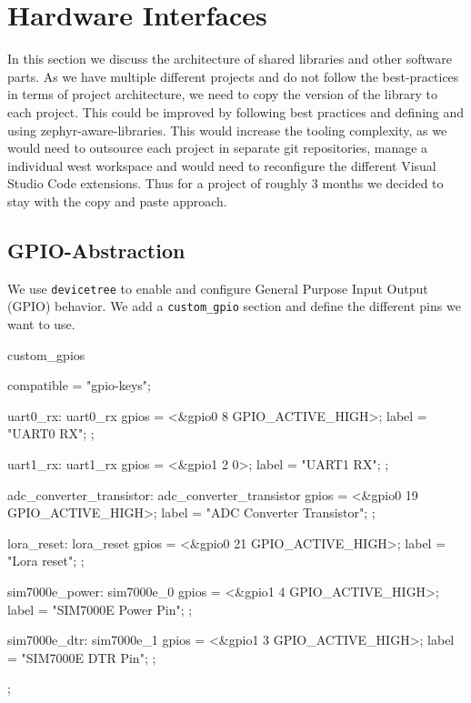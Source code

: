 \section{Hardware Interfaces}

In this section we discuss the architecture of shared libraries and other software parts.
As we have multiple different projects and do not follow the best-practices in terms of project architecture, we need to copy the version of the library to each project.
This could be improved by following best practices and defining and using zephyr-aware-libraries. This would increase the tooling complexity, as we would need to outsource each project in separate git repositories, manage a individual west workspace and would need to reconfigure the different Visual Studio Code extensions. Thus for a project of roughly 3 months we decided to stay with the copy and paste approach. 

\subsection{GPIO-Abstraction}

We use \verb|devicetree| to enable and configure General Purpose Input Output (GPIO) behavior.
We add a \verb|custom_gpio| section and define the different pins we want to use. 

\begin{cpp}[caption={Definition of GPIO-Pins in Devicetree}]
custom_gpios {

    compatible = "gpio-keys";

    uart0_rx: uart0_rx {
        gpios = <&gpio0 8 GPIO_ACTIVE_HIGH>;
        label = "UART0 RX";
    };

    uart1_rx: uart1_rx {
        gpios = <&gpio1 2 0>;
        label = "UART1 RX";
    };

    adc_converter_transistor: adc_converter_transistor {
        gpios = <&gpio0 19 GPIO_ACTIVE_HIGH>;
        label = "ADC Converter Transistor";
    };

    lora_reset: lora_reset {
        gpios = <&gpio0 21 GPIO_ACTIVE_HIGH>;
        label = "Lora reset";
    };

    sim7000e_power: sim7000e_0 {
        gpios = <&gpio1 4 GPIO_ACTIVE_HIGH>;
        label = "SIM7000E Power Pin";
    };

    sim7000e_dtr: sim7000e_1 {
        gpios = <&gpio1 3 GPIO_ACTIVE_HIGH>;
        label = "SIM7000E DTR Pin";
    };
};
\end{cpp}

